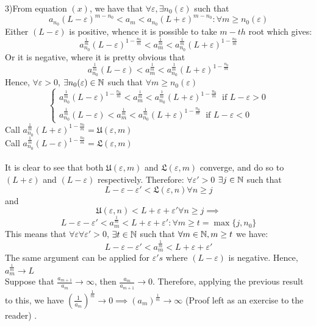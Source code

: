 \documentclass[../Main.tex]{subfiles}
\begin{document}
{3)From equation $(x)$, we have that $\forall \varepsilon, \exists n_0(\varepsilon)$ such that $$a_{n_0}(L-\varepsilon)^{m-{n_0}} < a_m<a_{n_0}(L+\varepsilon)^{m-{n_0}}: \forall m \geq n_0(\varepsilon)$$
Either $(L-\varepsilon)$ is positive, whence it is possible to take $m-th$ root which gives: $$a_{n_0}^{\frac{1}{m}}(L-\varepsilon)^{1-\frac{n_0}{m} }<a_m^{\frac{1}{m}}<a_{n_0}^{\frac{1}{m}} (L+\varepsilon)^{1-\frac{n_0}{m}}$$ Or it is negative, where it is pretty obvious that $$a_{n_0}^{\frac{1}{m}}(L-\varepsilon)<a_m^{\frac{1}{m}}<a_{n_0}^{\frac{1}{m}} (L+\varepsilon)^{1-\frac{n_0}{m}}$$ Hence, $\forall \varepsilon>0$, $\exists n_0(\varepsilon) \in \NN$ such that $\forall m \geq n_0(\varepsilon)$ 
$$
\begin{cases}
    a_{n_0}^{\frac{1}{m}}(L-\varepsilon)^{1-\frac{n_0}{m} }<a_m^{\frac{1}{m}}<a_{n_0}^{\frac{1}{m}} (L+\varepsilon)^{1-\frac{n_0}{m}} \ \text{ if } L-\varepsilon>0 \\
    a_{n_0}^{\frac{1}{m}}(L-\varepsilon)<a_m^{\frac{1}{m}}<a_{n_0}^{\frac{1}{m}} (L+\varepsilon)^{1-\frac{n_0}{m}} \ \text{ if } L- \varepsilon <0
    
\end{cases}
$$
Call $a_{n_0}^{ \frac{1}{m} }(L+\varepsilon)^{1-\frac{n_0}{m}}= \mathfrak{U}(\varepsilon,m)$\\
Call $a_{n_0}^{\frac{1}{m}}(L-\varepsilon)^{1-\frac{n_0}{m}}= \mathfrak{L}(\varepsilon,m) $\\\\
It is clear to see that both $\mathfrak{U}(\varepsilon,m)$ and $\mathfrak{L}(\varepsilon,m)$ converge, and do so to $(L+\varepsilon)$ and $(L-\varepsilon)$ respectively. Therefore: $\forall \varepsilon'>0$ $\exists j \in \NN$ such that $$L-\varepsilon-\varepsilon'<\mathfrak{L}(\varepsilon,n) \forall n \geq j$$ and 
$$\mathfrak{U}(\varepsilon,n)<L+\varepsilon+\varepsilon' \forall n \geq j \implies$$
$$L-\varepsilon-\varepsilon'<a_m^{\frac{1}{m}}<L+\varepsilon+\varepsilon': \forall m \geq t=\max\{j,n_0\}$$ This means that $\forall \varepsilon \forall \varepsilon' >0$, $\exists t \in \NN$ such that $\forall m \in \NN, m \geq t$ we have: $$ L-\varepsilon-\varepsilon'<a_m^{\frac{1}{m}}<L+\varepsilon+\varepsilon'$$
The same argument can be applied for $\varepsilon's$ where $(L-\varepsilon)$ is negative.
Hence, $a_m^{\frac{1}{m}} \to L$\\
Suppose that $\frac{a_{m+1}}{a_m} \to \infty$, then $\frac{a_{m}}{a_{m+1}} \to 0$. Therefore, applying the previous result to this, we have $(\frac{1}{a_m})^{\frac{1}{m}} \to 0 \implies (a_m)^{\frac{1}{m}} \to \infty$ (Proof left as an exercise to the reader) 
}
.
\end{document}
